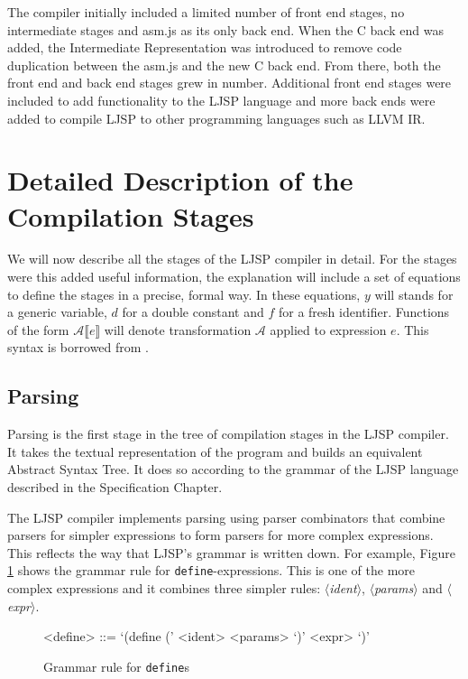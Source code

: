 \documentclass[11pt]{report}
\begin{document}
The compiler initially included a limited number of front end stages, no intermediate stages and asm.js as its only back end. When the C back end was added, the Intermediate Representation was introduced to remove code duplication between the asm.js and the new C back end. From there, both the front end and back end stages grew in number. Additional front end stages were included to add functionality to the LJSP language and more back ends were added to compile LJSP to other programming languages such as LLVM IR. 

\section{Detailed Description of the Compilation Stages}
We will now describe all the stages of the LJSP compiler in detail. For the stages were this added useful information, the explanation will include a set of equations to define the stages in a precise, formal way. In these equations, $y$ will stands for a generic variable, $d$ for a double constant and $f$ for a fresh identifier. Functions of the form $\mathcal{A}\llbracket e \rrbracket$ will denote transformation $\mathcal{A}$ applied to expression $e$. This syntax is borrowed from \cite{sysftal}.

\subsection{Parsing}
Parsing is the first stage in the tree of compilation stages in the LJSP compiler. It takes the textual representation of the program and builds an equivalent Abstract Syntax Tree. It does so according to the grammar of the LJSP language described in the Specification Chapter.

The LJSP compiler implements parsing using parser combinators that combine parsers for simpler expressions to form parsers for more complex expressions. This reflects the way that LJSP's grammar is written down. For example, Figure \ref{grammardefine} shows the grammar rule for \texttt{define}-expressions. This is one of the more complex expressions and it combines three simpler rules: \textit{$\langle$ident$\rangle$}, \textit{$\langle$params$\rangle$} and \textit{$\langle$expr$\rangle$}.
\begin{figure}[ht]
\begin{grammar}
<define> ::= `(define (' <ident> <params> `)' <expr> `)'
\end{grammar}
\caption{Grammar rule for \texttt{define}s}
\label{grammardefine}
\end{figure}
\end{document}
